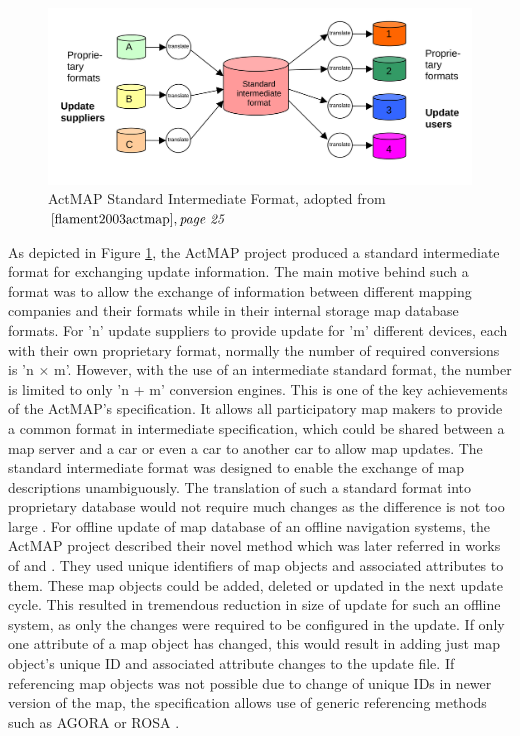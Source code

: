 \begin{figure}
\includegraphics[scale=.13]{ActMapExchange.png}
\caption{ActMAP Standard Intermediate Format, adopted from $\cite{flament2003actmap}, \textit{page 25}$}
\label{fg:actmap}
\end{figure}

As depicted in Figure \ref{fg:actmap}, the ActMAP project produced a standard intermediate format for exchanging update information. The main motive behind such a format was to allow the exchange of information between different mapping companies and their formats while in their internal storage map database formats. For 'n' update suppliers to provide update for 'm' different devices, each with their own proprietary format, normally the number of required conversions is 'n $\times$ m'. However, with the use of an intermediate standard format, the number is limited to only 'n + m' conversion engines. This is one of the key achievements of the ActMAP's specification. It allows all participatory map makers to provide a common format in intermediate specification, which could be shared between a map server and a car or even a car to another car to allow map updates. The standard intermediate format was designed to enable the exchange of map descriptions unambiguously. The translation of such a standard format into proprietary database would not require much changes as the difference is not too large \cite{flament2003actmap}. For offline update of map database of an offline navigation systems, the ActMAP project described their novel method which was later referred in works of \citet{sakamoto2000proposal} and \citet{asahara2008locally}. They used unique identifiers of map objects and associated attributes to them. These map objects could be added, deleted or updated in the next update cycle. This resulted in tremendous reduction in size of update for such an offline system, as only the changes were required to be configured in the update. If only one attribute of a map object has changed, this would result in adding just map object's unique ID and associated attribute changes to the update file. If referencing map objects was not possible due to change of unique IDs in newer version of the map, the specification allows use of generic referencing methods such as AGORA \cite{hummelsheimlocation} or ROSA \cite{demir2002new}.

